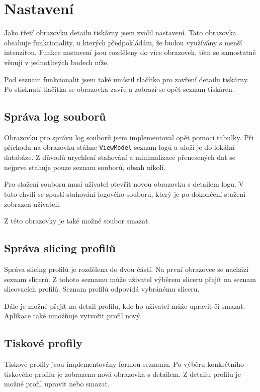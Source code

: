 \section{Nastavení}

Jako třetí obrazovku detailu tiskárny jsem zvolil nastavení.
Tato obrazovka obsahuje funkcionality, u kterých předpokládám, že budou využívány s menší intenzitou.
Funkce nastavení jsou rozděleny do více obrazovek, těm se samostatně věnuji v jednotlivých bodech níže.

Pod seznam funkcionalit jsem také umístil tlačítko pro zavření detailu tiskárny.
Po stisknutí tlačítka se obrazovka zavře a zobrazí se opět seznam tiskáren.

\subsection{Správa log souborů}

Obrazovku pro správu log souborů jsem implementoval opět pomocí tabulky.
Při příchodu na obrazovku stáhne \texttt{ViewModel} seznam logů a uloží je do lokální databáze.
Z důvodů urychlení stahování a minimalizace přenesených dat se nejprve stahuje pouze seznam souborů, obsah nikoli.

Pro stažení souboru musí uživatel otevřít novou obrazovku s detailem logu.
V tuto chvíli se spustí stahování logového souboru, který je po dokončení stažení zobrazen uživateli.

Z této obrazovky je také možné soubor smazat.

\subsection{Správa slicing profilů}

Správa slicing profilů je rozdělena do dvou částí.
Na první obrazovce se nachází seznam slicerů.
Z tohoto seznamu může uživatel výběrem sliceru přejít na seznam slicovacích profilů.
Seznam profilů odpovídá vybránému sliceru.

Dále je možné přejít na detail profilu, kde ho uživatel může upravit či smazat.
Aplikace také umožňuje vytvořit profil nový.

\subsection{Tiskové profily}

Tiskové profily jsou implementovány formou seznamu.
Po výběru konkrétního tiskového profilu je zobrazena nová obrazovka s detailem.
Z detailu profilu je možné profil upravit nebo smazat.

